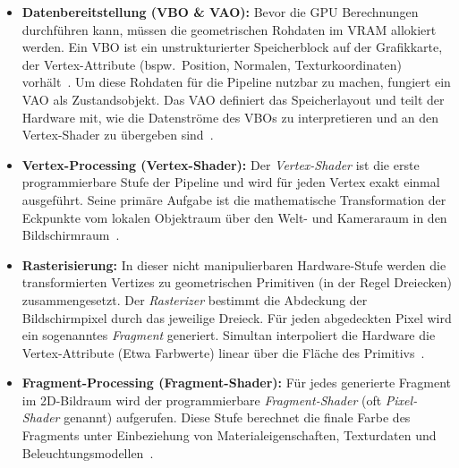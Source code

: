 \begin{itemize}
    \item \textbf{Datenbereitstellung (VBO \& VAO):}
    Bevor die \ac{GPU} Berechnungen durchführen kann, müssen die geometrischen Rohdaten im \ac{VRAM} allokiert werden.
    Ein \ac{VBO} ist ein unstrukturierter Speicherblock auf der Grafikkarte, der
    Vertex-Attribute (bspw.\ Position, Normalen, Texturkoordinaten) vorhält~\parencite[vgl.][Kap.~2.9.2]{OpenGL33Core2010}.
    Um diese Rohdaten für die Pipeline nutzbar zu machen, fungiert ein \ac{VAO} als
    Zustandsobjekt.
    Das \ac{VAO} definiert das Speicherlayout und teilt der Hardware mit, wie die Datenströme des \acp{VBO} zu
    interpretieren und an den Vertex-Shader zu übergeben sind~\parencite[vgl.][Kap.~2.10]{OpenGL33Core2010}.

    \item \textbf{Vertex-Processing (Vertex-Shader):}
    Der \textit{Vertex-Shader} ist die erste programmierbare Stufe der Pipeline und wird für jeden Vertex exakt einmal
    ausgeführt.
    Seine primäre Aufgabe ist die mathematische Transformation der Eckpunkte vom lokalen Objektraum über den Welt- und
    Kameraraum in den Bildschirmraum~\parencite[vgl.][Kap.~3.5]{akenine-mollerRealtimeRendering2019}.

    \item \textbf{Rasterisierung:}
    In dieser nicht manipulierbaren Hardware-Stufe werden die transformierten Vertizes zu geometrischen Primitiven
    (in der Regel Dreiecken) zusammengesetzt.
    Der \textit{Rasterizer} bestimmt die Abdeckung der Bildschirmpixel durch das jeweilige Dreieck.
    Für jeden abgedeckten Pixel wird ein sogenanntes \textit{Fragment} generiert.
    Simultan interpoliert die Hardware die Vertex-Attribute (Etwa Farbwerte) linear über die Fläche des
    Primitivs~\parencite[vgl.][Kap.~11.1.4.7]{gregoryGameEngineArchitecture2018}.

    \item \textbf{Fragment-Processing (Fragment-Shader):}
    Für jedes generierte Fragment im 2D-Bildraum wird der programmierbare \textit{Fragment-Shader} (oft
    \textit{Pixel-Shader} genannt) aufgerufen.
    Diese Stufe berechnet die finale Farbe des Fragments unter Einbeziehung von Materialeigenschaften, Texturdaten und
    Beleuchtungsmodellen~\parencite[vgl.][Kap.~3.8]{akenine-mollerRealtimeRendering2019}.


\end{itemize}

